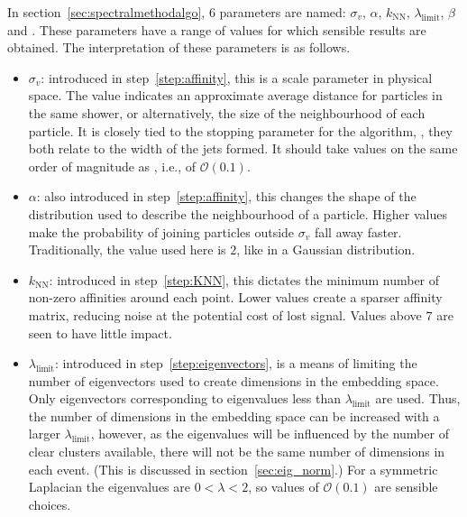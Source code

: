 In section~\ref{sec:spectralmethodalgo}, 6 parameters are named:
\(\sigma_v\), \(\alpha\), \(k_\text{NN}\), \(\lambda_\text{limit}\), \(\beta\) and \stoppingdeltar{}.
These parameters have a range of values for which sensible results are obtained.
The interpretation of these parameters is as follows.
\begin{itemize}
    \item \(\sigma_v\): introduced in step~\ref{step:affinity}, this is a scale parameter in physical space.
                      The value indicates an approximate average distance for particles in the same shower,
                      or alternatively, the size of the neighbourhood of each particle.
                      It is closely tied to the stopping parameter for the \genkt{} algorithm, \ktstoppingdeltar{},
                      they both relate to the width of the jets formed.
                      It should take values on the same order of magnitude as \ktstoppingdeltar{}, i.e., of \(\mathcal{O} (0.1)\).
    \item  \(\alpha\): also introduced in step~\ref{step:affinity},
           this changes the shape of the distribution used to describe the neighbourhood of a particle.
           Higher values make the probability of joining particles outside \(\sigma_v\) fall away faster.
           Traditionally, the value used here is \(2\), like in a Gaussian distribution.
       \item \(k_\text{NN}\): introduced in step~\ref{step:KNN}, this dictates the minimum number of non-zero affinities around each point.
           Lower values create a sparser affinity matrix, reducing noise at the potential cost of lost signal.
           Values above \(7\) are seen to have little impact.
       \item  \(\lambda_\text{limit}\): introduced in step~\ref{step:eigenvectors}, is a means of limiting the number of eigenvectors used
           to create dimensions in the embedding space.
           Only eigenvectors corresponding to eigenvalues less than \(\lambda_\text{limit}\) are used.
           Thus, the number of dimensions in the embedding space can be increased with a larger \(\lambda_\text{limit}\),
           however, as the eigenvalues will be influenced by the number of clear clusters available, 
           there will not be the same number of dimensions in each event.
           (This is discussed in section~\ref{sec:eig_norm}.)
           For a symmetric Laplacian the eigenvalues are \(0 < \lambda < 2\),
           so values of \(\mathcal{O} (0.1)\) are sensible choices.

\end{itemize}

